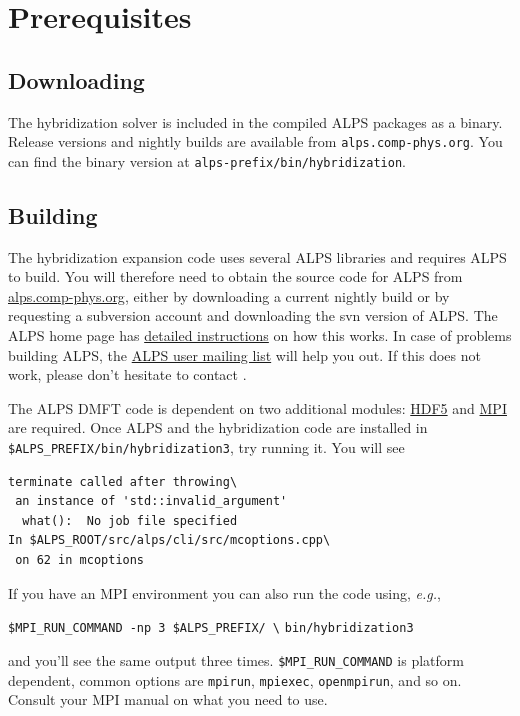 \documentclass[aps,prb,floatfix,superscriptaddress,twocolumn,notitlepage]{revtex4-1}
\begin{document}
\section{Prerequisites}
\subsection{Downloading}
The hybridization solver is included in the compiled ALPS packages as a binary. Release versions and nightly builds are available from \verb#alps.comp-phys.org#. You can find the binary version at \verb#alps-prefix#\verb#/bin#\verb#/hybridization#.
\subsection{Building}
The hybridization expansion code uses several ALPS libraries\cite{ALPS20} and requires ALPS to build. You will therefore need to obtain the source code for ALPS from \href{http://alps.comp-phys.org}{alps.comp-phys.org}, either by downloading a current nightly build or by requesting a subversion account and downloading the svn version of ALPS. The ALPS home page has \href{http://alps.comp-phys.org/mediawiki/index.php/Download_and_install_ALPS_2}{detailed instructions} on how this works. In case of problems building ALPS, the \href{mailto:comp-phys-alps-users@lists.phys.ethz.ch}{ALPS user mailing list} will help you out. If this does not work, please don't hesitate to  contact \Emanuel.

The ALPS DMFT code is dependent on two additional modules: \href{http://www.hdfgroup.org/}{HDF5} and \href{http://www.openmpi.org}{MPI} are required.
Once ALPS and the hybridization code are installed in \verb#$ALPS_PREFIX/#\verb#bin/#\verb#hybridization3#, try running it. You will see
\begin{verbatim}
terminate called after throwing\
 an instance of 'std::invalid_argument'
  what():  No job file specified
In $ALPS_ROOT/src/alps/cli/src/mcoptions.cpp\
 on 62 in mcoptions
\end{verbatim}

If you have an MPI environment you can also run the code using, {\it e.g.},

\verb#$MPI_RUN_COMMAND -np 3 $ALPS_PREFIX/ \#
\verb#bin/hybridization3#

and you'll see the same output three times. \verb#$MPI_RUN_COMMAND# is platform dependent, common options are \verb#mpirun#, \verb#mpiexec#, \verb#openmpirun#, and so on. Consult your MPI manual on what you need to use.
\end{document}
